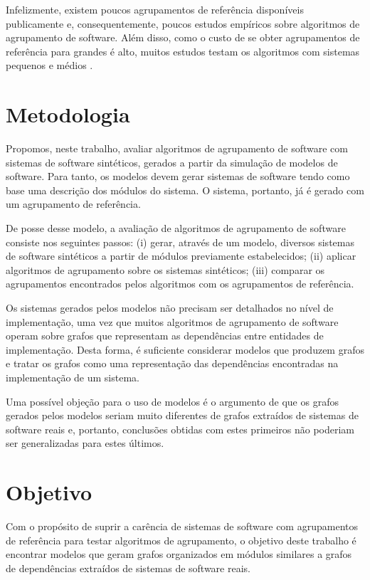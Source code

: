 Infelizmente, existem poucos agrupamentos de referência disponíveis publicamente \cite{Koschke2000} e, consequentemente, poucos estudos empíricos sobre algoritmos de agrupamento de software. Além disso, como o custo de se obter agrupamentos de referência para grandes é alto, muitos estudos testam os algoritmos com sistemas pequenos e médios \cite{Anquetil1999,Maqbool2007,Bittencourt2009}.

\section{Metodologia}

Propomos, neste trabalho, avaliar algoritmos de agrupamento de software com sistemas de software sintéticos, gerados a partir da simulação de modelos de software. Para tanto, os modelos devem gerar sistemas de software tendo como base uma descrição dos módulos do sistema. O sistema, portanto, já é gerado com um agrupamento de referência.

De posse desse modelo, a avaliação de algoritmos de agrupamento de software consiste nos seguintes passos: (i) gerar, através de um modelo, diversos sistemas de software sintéticos a partir de módulos previamente estabelecidos; (ii) aplicar algoritmos de agrupamento sobre os sistemas sintéticos; (iii) comparar os agrupamentos encontrados pelos algoritmos com os agrupamentos de referência.

Os sistemas gerados pelos modelos não precisam ser detalhados no nível de implementação, uma vez que muitos algoritmos de agrupamento de software operam sobre grafos que representam as dependências entre entidades de implementação. Desta forma, é suficiente considerar modelos que produzem grafos e tratar os grafos como uma representação das dependências encontradas na implementação de um sistema.

Uma possível objeção para o uso de modelos é o argumento de que os grafos gerados pelos modelos seriam muito diferentes de grafos extraídos de sistemas de software reais e, portanto, conclusões obtidas com estes primeiros não poderiam ser generalizadas para estes últimos.

\section{Objetivo}

Com o propósito de suprir a carência de sistemas de software com agrupamentos de referência para testar algoritmos de agrupamento, o objetivo deste trabalho é encontrar modelos que geram grafos organizados em módulos similares a grafos de dependências extraídos de sistemas de software reais.

